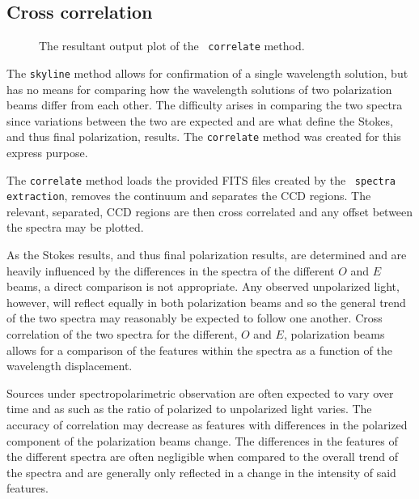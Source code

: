 \subsection{Cross correlation}



\begin{figure}[t]
    \centering
    \caption{The resultant output plot of the \stops\ \texttt{correlate} method.}
    \label{fig:stops_corr_eg}
\end{figure}

The \texttt{skyline} method allows for confirmation of a single wavelength solution, but has no means for comparing how the wavelength solutions of two polarization beams differ from each other. The difficulty arises in comparing the two spectra since variations between the two are expected and are what define the Stokes, and thus final polarization, results. The \texttt{correlate} method was created for this express purpose.

The \texttt{correlate} method loads the provided \gls{FITS} files created by the \polsalt\ \texttt{spectra extraction}, removes the continuum and separates the \gls{CCD} regions. The relevant, separated, \gls{CCD} regions are then cross correlated and any offset between the spectra may be plotted.

As the Stokes results, and thus final polarization results, are determined and are heavily influenced by the differences in the spectra of the different $O$ and $E$ beams, a direct comparison is not appropriate. Any observed unpolarized light, however, will reflect equally in both polarization beams and so the general trend of the two spectra may reasonably be expected to follow one another. Cross correlation of the two spectra for the different, $O$ and $E$, polarization beams allows for a comparison of the features within the spectra as a function of the wavelength displacement.

Sources under spectropolarimetric observation are often expected to vary over time and as such as the ratio of polarized to unpolarized light varies. The accuracy of correlation may decrease as features with differences in the polarized component of the polarization beams change. The differences in the features of the different spectra are often negligible when compared to the overall trend of the spectra and are generally only reflected in a change in the intensity of said features.

